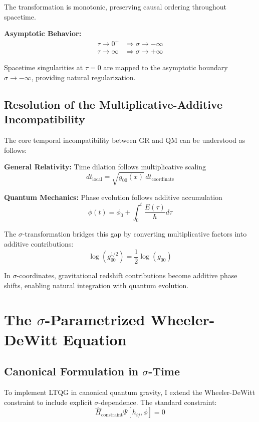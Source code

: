 \documentclass[12pt,a4paper]{article}
\begin{document}
The transformation is monotonic, preserving causal ordering throughout spacetime.

\textbf{Asymptotic Behavior:}
\begin{align}
\tau \to 0^+ &\Rightarrow \sigma \to -\infty \\
\tau \to \infty &\Rightarrow \sigma \to +\infty
\end{align}

Spacetime singularities at $\tau = 0$ are mapped to the asymptotic boundary $\sigma \to -\infty$, providing natural regularization.

\subsection{Resolution of the Multiplicative-Additive Incompatibility}

The core temporal incompatibility between GR and QM can be understood as follows:

\textbf{General Relativity:} Time dilation follows multiplicative scaling
\begin{equation}
dt_{\text{local}} = \sqrt{g_{00}(x)} \, dt_{\text{coordinate}}
\end{equation}

\textbf{Quantum Mechanics:} Phase evolution follows additive accumulation
\begin{equation}
\phi(t) = \phi_0 + \int_0^t \frac{E(\tau)}{\hbar} d\tau
\end{equation}

The $\sigma$-transformation bridges this gap by converting multiplicative factors into additive contributions:
\begin{equation}
\log(g_{00}^{1/2}) = \frac{1}{2}\log(g_{00})
\end{equation}

In $\sigma$-coordinates, gravitational redshift contributions become additive phase shifts, enabling natural integration with quantum evolution.

\section{The $\sigma$-Parametrized Wheeler-DeWitt Equation}

\subsection{Canonical Formulation in $\sigma$-Time}

To implement LTQG in canonical quantum gravity, I extend the Wheeler-DeWitt constraint to include explicit $\sigma$-dependence. The standard constraint:
\begin{equation}
\hat{H}_{\text{constraint}} \Psi[h_{ij}, \phi] = 0
\end{equation}
\end{document}
